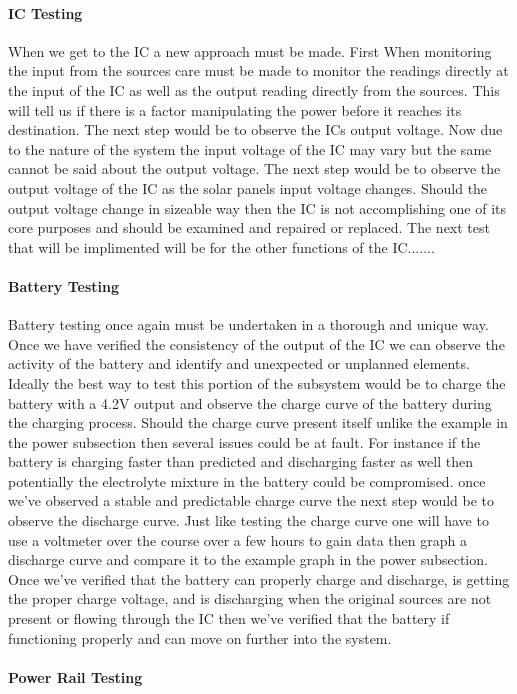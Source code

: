 \paragraph{IC Testing}
When we get to the IC a new approach must be made. First When monitoring the input from the sources care must be made to monitor the readings directly at the input of the IC as well as the output reading directly from the sources. This will tell us if there is a factor manipulating the power before it reaches its destination. The next step would be to observe the ICs output voltage. Now due to the nature of the system the input voltage of the IC may vary but the same cannot be said about the output voltage. The next step would be to observe the output voltage of the IC as the solar panels input voltage changes. Should the output voltage change in sizeable way then the IC is not accomplishing one of its core purposes and should be examined and repaired or replaced. The next test that will be implimented will be for the other functions of the IC.......

\paragraph{Battery Testing}
Battery testing once again must be undertaken in a thorough and unique way. Once we have verified the consistency of the output of the IC we can observe the activity of the battery and identify and unexpected or unplanned elements. Ideally the best way to test this portion of the subsystem would be to charge the battery with a 4.2V output and observe the charge curve of the battery during the charging process. Should the charge curve present itself unlike the example in the power subsection then several issues could be at fault. For instance if the battery is charging faster than predicted and discharging faster as well then potentially the electrolyte mixture in the battery could be compromised. once we've observed a stable and predictable charge curve the next step would be to observe the discharge curve. Just like testing the charge curve one will have to use a voltmeter over the course over a few hours to gain data then graph a discharge curve and compare it to the example graph in the power subsection. Once we've verified that the battery can properly charge and discharge, is getting the proper charge voltage, and is discharging when the original sources are not present or flowing through the IC then we've verified that the battery if functioning properly and can move on further into the system.
\paragraph{Power Rail Testing}

